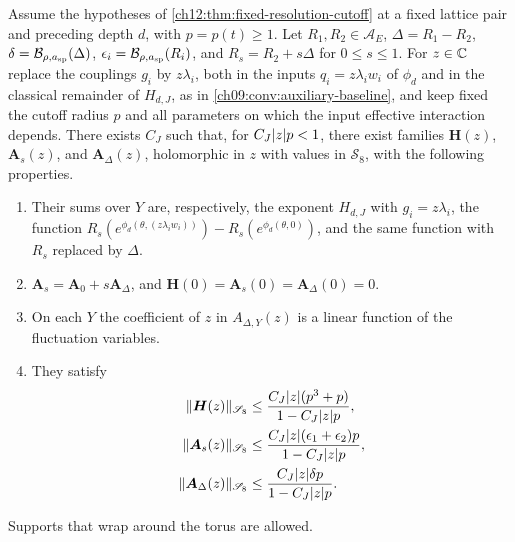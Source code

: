 \begin{lemma}\label{ch12:lem:supported-difference}
Assume the hypotheses of \cref{ch12:thm:fixed-resolution-cutoff} at a fixed lattice pair and preceding depth $d$, with $p=p(t)\ge1$. Let $R_1,R_2\in\mathcal A_E$, $\Delta=R_1-R_2$, $\delta=\mathcal B_{\rho,a_{\mathrm{sp}}}(\Delta)$, $\epsilon_i=\mathcal B_{\rho,a_{\mathrm{sp}}}(R_i)$, and $R_s=R_2+s\Delta$ for $0\le s\le1$. For $z\in\mathbb C$ replace the couplings $g_i$ by $z\lambda_i$, both in the inputs $q_i=z\lambda_iw_i$ of $\phi_d$ and in the classical remainder of $H_{d,J}$, as in \cref{ch09:conv:auxiliary-baseline}, and keep fixed the cutoff radius $p$ and all parameters on which the input effective interaction depends. There exists $C_J$ such that, for $C_J\lvert z\rvert p<1$, there exist families $\boldsymbol H(z)$, $\boldsymbol A_s(z)$, and $\boldsymbol A_\Delta(z)$, holomorphic in $z$ with values in $\mathscr S_8$, with the following properties.
\begin{enumerate}
\item Their sums over $Y$ are, respectively, the exponent $H_{d,J}$ with $g_i=z\lambda_i$, the function $R_s(e^{\phi_d(\theta,(z\lambda_iw_i))})-R_s(e^{\phi_d(\theta,0)})$, and the same function with $R_s$ replaced by $\Delta$.
\item $\boldsymbol A_s=\boldsymbol A_0+s\boldsymbol A_\Delta$, and $\boldsymbol H(0)=\boldsymbol A_s(0)=\boldsymbol A_\Delta(0)=0$.
\item On each $Y$ the coefficient of $z$ in $A_{\Delta,Y}(z)$ is a linear function of the fluctuation variables.
\item They satisfy
\begin{equation}\label{ch12:eq:marked-primitive}
 \begin{split}
 \lVert \boldsymbol H(z)\rVert_{\mathscr S_8}&\le\frac{C_J\lvert z\rvert(p^3+p)}{1-C_J\lvert z\rvert p},\\
 \lVert \boldsymbol A_s(z)\rVert_{\mathscr S_8}&\le\frac{C_J\lvert z\rvert(\epsilon_1+\epsilon_2)p}{1-C_J\lvert z\rvert p},\\
 \lVert \boldsymbol A_\Delta(z)\rVert_{\mathscr S_8}&\le\frac{C_J\lvert z\rvert\delta p}{1-C_J\lvert z\rvert p}.
 \end{split}
\end{equation}
\end{enumerate}
Supports that wrap around the torus are allowed.
\end{lemma}

